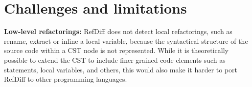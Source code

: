 \section{Challenges and limitations}
\label{sec:challenges}


\textbf{Low-level refactorings:} RefDiff does not detect local refactorings, such as rename, extract or inline a local variable, because the syntactical structure of the source code within a CST node is not represented.
While it is theoretically possible to extend the CST to include finer-grained code elements such as statements, local variables, and others, this would also make it harder to port RefDiff to other programming languages.




